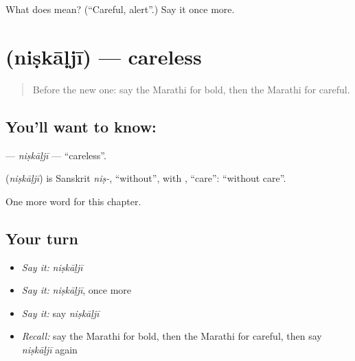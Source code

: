 \begin{tcolorbox}[breakable,colback=teal!4,colframe=teal!35!black,title={Before you move on}]
What does  mean? (\textquotedblleft{}Careful, alert\textquotedblright{}.) Say it once more.
\end{tcolorbox}
\section[\texorpdfstring{\mr{निष्काळजी} (niṣkāḷjī)}{निष्काळजी (niṣkāḷjī)}]{ (niṣkāḷjī) — careless}

\label{lesson:MR-C207-niskalji}



\begin{quote}
Before the new one: say the Marathi for bold, then the Marathi for careful.
\end{quote}

\subsection*{You'll want to know: }
\textbf{} — \emph{niṣkāḷjī} — \textquotedblleft{}careless\textquotedblright{}.

\begin{cousinweb}
\textbf{} (\emph{niṣkāḷjī}) is Sanskrit \emph{niṣ-}, \textquotedblleft{}without\textquotedblright{}, with \textbf{}, \textquotedblleft{}care\textquotedblright{}: \textquotedblleft{}without care\textquotedblright{}.
\end{cousinweb}

\begin{grammarlens}[title={What you've built}]
One more word for this chapter.
\end{grammarlens}

\subsection*{Your turn}
\begin{itemize}
\raggedright
  \item \emph{Say it:} \emph{niṣkāḷjī}
  \item \emph{Say it:} \emph{niṣkāḷjī}, once more
  \item \emph{Say it:} say \emph{niṣkāḷjī}
  \item \emph{Recall:} say the Marathi for bold, then the Marathi for careful, then say \emph{niṣkāḷjī} again
\end{itemize}

